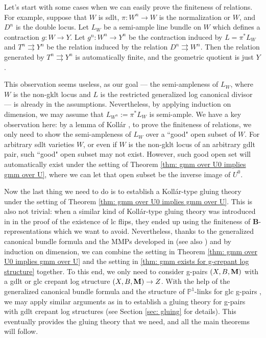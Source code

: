 \documentclass[11pt]{amsart}
\numberwithin{equation}{section}
\newcommand{\Mm}{{\bf{M}}}
\theoremstyle{definition}
\theoremstyle{definition}
\theoremstyle{definition}
\begin{document}
\smallskip

Let's start with some cases when we can easily prove the finiteness
of relations. For example, suppose that $W$ is sdlt, $\pi: W^n\to W$
is the normalization or $W$, and $D^n$ is the double locus. Let $L_W$
be a semi-ample line bundle on $W$ which defines a contraction $g:
W\to Y$. Let $g^n: W^n\to Y^n$ be the contraction induced by
$L=\pi^*L_W$ and $T^n\rightrightarrows Y^n$ be the relation induced
by the relation $D^n\rightrightarrows W^n$. Then the relation
generated by $T^n\rightrightarrows Y^n$ is automatically finite, and
the geometric quotient is just $Y$.

This observation seems useless, as our goal --- the semi-ampleness of
$L_W$, where $W$ is the non-gklt locus and $L$ is the restricted
generalized log canonical divisor --- is already in the assumptions.
Nevertheless, by applying induction on dimension, we may assume that
$L_{W^n}:=\pi^*L_W$ is semi-ample. We have a key observation here: by
a lemma of Koll\'ar  \cite[Lemma 9.55]{Kol13}, to prove the
finiteness of relations, we only need to show the semi-ampleness of
$L_W$ over a ``good" open subset of $W$. For arbitrary sdlt varieties
$W$, or even if $W$ is the non-gklt locus of an arbitrary gdlt pair,
such ``good" open subset may not exist. However, such good open set
will automatically exist under the setting of Theorem \ref{thm: gmm
over U0 implies gmm over U}, where we can let that open subset be the
inverse image of $U^0$.

Now the last thing we need to do is to establish a Koll\'ar-type
gluing theory under the setting of Theorem \ref{thm: gmm over U0
implies gmm over U}. This is also not trivial: when a similar kind of
Koll\'ar-type gluing theory was introduced in \cite{HX13,HX16} in the
proof of the existence of lc flips, they ended up using the
finiteness of \textbf{B}-representations which we want to avoid.
Nevertheless, thanks to the generalized canonical bundle formula and
the MMPs developed in \cite{LX22} (see also \cite{HL21a,Has22}) and
by induction on dimension, we can combine the setting in Theorem
\ref{thm: gmm over U0 implies gmm over U} and the setting in
\ref{thm: gmm exists for g-crepant log structure} together. To this
end, we only need to consider g-pairs $(X,B,\Mm)$ with a gdlt or glc
crepant log structure $(X,B,\Mm)\rightarrow Z$. With the help of the
generalized canonical bundle formula \cite{Fil20,FS20,HL21b,JLX22}
and the structure of $\mathbb P^1$-links for glc g-pairs \cite{FS20},
we may apply similar arguments as in \cite[Chapter 4]{Kol13} to
establish a gluing theory for g-pairs with gdlt crepant log
structures (see Section \ref{sec: gluing} for details). This
eventually provides the gluing theory that we need, and all the main
theorems will follow.
\end{document}
